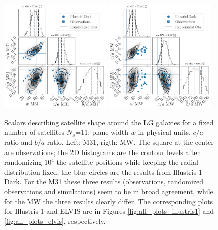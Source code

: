 \documentclass[a4paper,fleqn,usenatbib]{mnras}
\begin{document}
\begin{figure}
\centering
\includegraphics[width=0.48\textwidth]{input_illustris1dark_obs_M31_n_11.pdf}
\includegraphics[width=0.48\textwidth]{input_illustris1dark_obs_MW_n_11.pdf}
\caption{Scalars describing satellite shape around the LG galaxies for
  a fixed number of satellites $N_s$=11:
  plane width $w$ in physical units, $c/a$ ratio and $b/a$ ratio.
  Left: M31, rigth: MW. The square at the center are observations; the
2D histograms are the contour levels after randomizing $10^4$ the
satellite positions while keeping the radial distribution fixed; the
blue circles are the results from Illustris-1-Dark. For the M31 these
three results (observations, randomized observations and simulations)
seem to be in broad agreement, while for the MW the three results
clearly differ. 
The corresponding plots for Illustris-1 and ELVIS are
in Figures \ref{fig:all_plots_illustris1} and
\ref{fig:all_plots_elvis},
respectively. \label{fig:physical_illustris1dark}}     
\end{figure}
\end{document}
